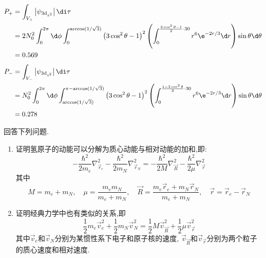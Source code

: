 \documentclass{ctexart}
\begin{document}
\begin{solution}
\begin{enumerate}[label=\tbf{(\alph*)}]
    \[\begin{aligned}
        P_+
        &=\int_{V_+}\left|\psi_{3\text{d}_{z^2}}\right|\di\tau\\
        &=2N_0^2\int_0^{2\pi}\d\phi\int_0^{\arccos(1/\sqrt{3})}\left(3\cos^2\theta-1\right)^2\left(\int_0^{\frac{3\cos^2\theta-1}{2}\cdot30}r^6\e^{-2r/3}\d r\right)\sin\theta\d\theta\\
        &=0.569
    \end{aligned}\]
    \[\begin{aligned}
        P_-
        &=\int_{V_-}\left|\psi_{3\text{d}_{z^2}}\right|\di\tau\\
        &=N_0^2\int_0^{2\pi}\d\phi\int_{\arccos(1/\sqrt{3})}^{\pi-\arccos(1/\sqrt{3})}\left(3\cos^2\theta-1\right)^2\left(\int_0^{\frac{1-3\cos^2\theta}{2}\cdot30}r^6\e^{-2r/3}\d r\right)\sin\theta\d\theta\\
        &=0.278
    \end{aligned}\]
\end{enumerate}
\end{solution}
\begin{homework}[6.]
    回答下列问题.
    \begin{enumerate}[label=\tbf(\alph*)]
        \item 证明氢原子的动能可以分解为质心动能与相对动能的加和,即:
        \[-\dfrac{\hbar^2}{2m_e}\nabla_{\vec{r}_e}^2-\dfrac{\hbar^2}{2m_N}\nabla_{\vec{r}_N}^2=-\dfrac{\hbar^2}{2M}\nabla_{\vec{R}}^2-\dfrac{\hbar^2}{2\mu}\nabla_{\vec{r}}^2\]
        其中
        \[M=m_e+m_N,\quad\mu=\dfrac{m_em_N}{m_e+m_N},\quad\vec{R}=\dfrac{m_e\vec{r}_e+m_N\vec{r}_N}{m_e+m_N},\quad\vec{r}=\vec{r}_e-\vec{r}_N\]
        \item 证明经典力学中也有类似的关系,即
        \[\dfrac12m_e\vec{v}_e^2+\dfrac12m_N\vec{v}_N^2=\dfrac12M\vec{v}_{\vec{R}}^2+\dfrac12\mu\vec{v}_{\vec{r}}^2\]
        其中$\vec{v}_e$和$\vec{v}_N$分别为某惯性系下电子和原子核的速度, $\vec{v}_{\vec{R}}$和$\vec{v}_{\vec{r}}$分别为两个粒子的质心速度和相对速度.
    \end{enumerate}
\end{homework}
\end{document}
